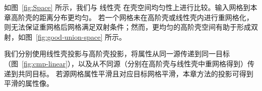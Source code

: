 如图~\ref{fig:Space} 所示，我们与 线性壳 在壳空间均匀性上进行比较。输入网格到本章高阶壳的距离分布更均匀。
%
若一个网格未在高阶壳或线性壳内进行重网格化，则无法保证重网格后网格满足双射条件；然而，更均匀的高阶壳空间有助于形成双射，如图~\ref{fig:good-union-space} 所示。


我们分别使用线性壳投影与高阶壳投影，将属性从同一源传递到同一目标（图~\ref{fig:cmp-linear}），以及从不同源（分别在高阶壳与线性壳中重网格得到）传递到共同目标。
若源网格属性平滑且对应目标网格平滑，本章方法的投影可得到平滑的属性像。


	




